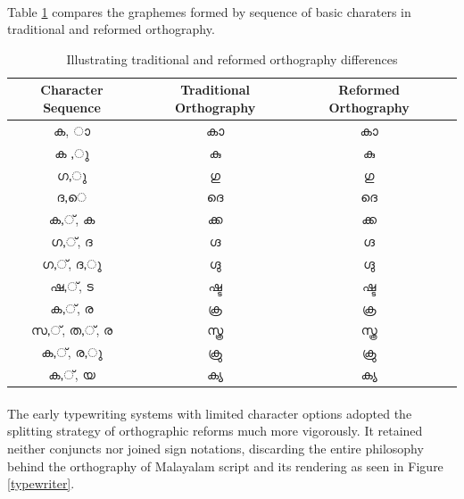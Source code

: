 \documentclass[10pt]{article}
\begin{document}
\paragraph{}
Table \ref{orthographycomparison} compares the graphemes formed by sequence of basic charaters in traditional and reformed orthography. 


\begin{table}
	\centering

\begin{tabular}{|c|c|c|c}
	\hline
	Character Sequence & Traditional Orthography & Reformed Orthography \\ \hline
	{\manjari ക, ാ} & {\manjari കാ} & {\raghu കാ} \\
	\hline
		{\manjari ക ,ു} & {\manjari കു} & {\raghu കു} \\
	\hline
		{\manjari ഗ,ു} & {\manjari ഗു} & {\raghu ഗു} \\
	\hline
		{\manjari ദ,െ} & {\manjari ദെ} & {\raghu ദെ}  \\
	\hline
		{\manjari ക,്, ക} & {\manjari ക്ക} & {\raghu ക്ക} \\
	\hline
		{\manjari ഗ,്, ദ} & {\manjari ഗ്ദ} & {\raghu ഗ്ദ} \\
	\hline
		{\manjari ഗ,്, ദ,ു} & {\manjari ഗ്ദു} & {\raghu ഗ്ദു} \\
	\hline
		{\manjari ഷ,്, ട} & {\manjari ഷ്ട} & {\raghu ഷ്ട} \\	
	\hline
		{\manjari ക,്, ര} & {\manjari ക്ര} & {\raghu ക്ര} \\
	\hline
		{\manjari സ,്, ത,്, ര} & {\manjari സ്ത്ര} & {\raghu സ്ത്ര} \\
	\hline
		{\manjari ക,്, ര,ു} & {\manjari ക്രു} & {\raghu ക്രു} \\
	\hline
		{\manjari ക,്, യ} & {\manjari ക്യ} & {\raghu ക്യ} \\
	\hline
\end{tabular}
\caption{Illustrating traditional and reformed orthography differences}
\label{orthographycomparison}
\end{table}

\paragraph{}
The early typewriting systems with limited character options adopted the splitting strategy of orthographic reforms much more vigorously. It retained neither conjuncts nor joined sign notations, discarding the entire philosophy behind the orthography of Malayalam script and its rendering as seen in Figure \ref{typewriter}.
\end{document}
